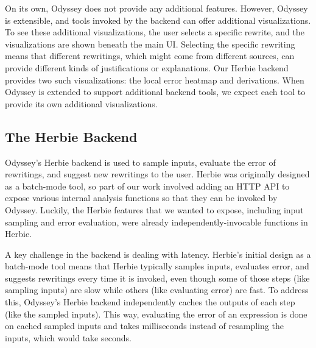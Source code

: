 On its own, Odyssey does not provide any additional features.
However, Odyssey is extensible,
  and tools invoked by the backend
  can offer additional visualizations.
To see these additional visualizations,
  the user selects a specific rewrite,
  and the visualizations are shown beneath the main UI.
Selecting the specific rewriting
  means that different rewritings,
  which might come from different sources,
  can provide different kinds of justifications or explanations.
Our Herbie backend provides two such visualizations:
  the local error heatmap and derivations.
When Odyssey is extended to support additional backend tools,
  we expect each tool to provide its own additional visualizations.

\subsection{The Herbie Backend}

Odyssey's Herbie backend is used
  to sample inputs, evaluate the error of rewritings,
  and suggest new rewritings to the user.
Herbie was originally designed as a batch-mode tool,
  so part of our work involved adding an HTTP API 
  to expose various internal analysis functions
  so that they can be invoked by Odyssey.
Luckily, the Herbie features that we wanted to expose,
  including input sampling and error evaluation,
  were already independently-invocable functions in Herbie.

A key challenge in the backend is dealing with latency.
Herbie's initial design as a batch-mode tool 
  means that Herbie typically
  samples inputs, evaluates error, and suggests rewritings
  every time it is invoked,
  even though some of those steps (like sampling inputs) are slow
  while others (like evaluating error) are fast.
To address this, Odyssey's Herbie backend
  independently caches the outputs of each step (like the sampled inputs).
This way, evaluating the error of an expression
  is done on cached sampled inputs and takes milliseconds
  instead of resampling the inputs, which would take seconds.

